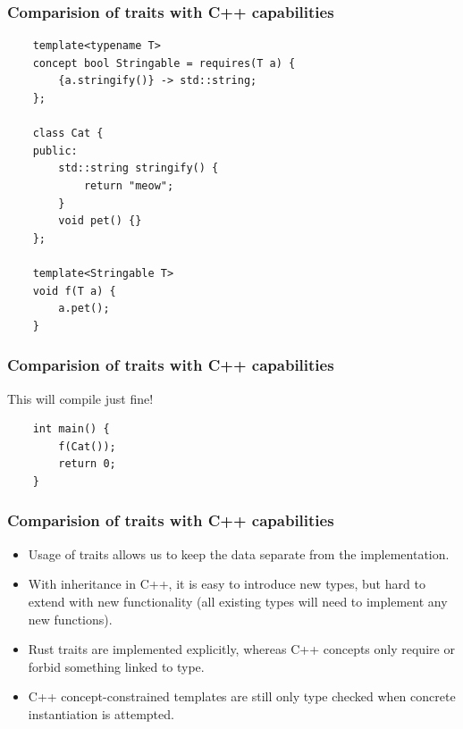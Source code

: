 \documentclass[aspectratio=1610,t]{beamer}
\begin{document}

\begin{frame}[fragile]
\frametitle{Comparision of traits with C++ capabilities}
\begin{verbatim}
    template<typename T>
    concept bool Stringable = requires(T a) {
        {a.stringify()} -> std::string;
    };

    class Cat {
    public:
        std::string stringify() {
            return "meow";
        }
        void pet() {}
    };

    template<Stringable T>
    void f(T a) {
        a.pet();
    }
\end{verbatim}
\end{frame}


\begin{frame}[fragile]
\frametitle{Comparision of traits with C++ capabilities}
This will compile just fine!

\begin{verbatim}
    int main() {
        f(Cat());
        return 0;
    }
\end{verbatim}
\end{frame}


\begin{frame}[fragile]
\frametitle{Comparision of traits with C++ capabilities}
\begin{itemize}
    \item<1-> Usage of traits allows us to keep the data separate from the implementation.
    \item<1-> With inheritance in C++, it is easy to introduce new types, but hard to extend with new functionality (all existing types will need to implement any new functions).
    \item<1-> Rust traits are implemented explicitly, whereas C++ concepts only require or forbid something linked to type.
    \item<1-> C++ concept-constrained templates are still only type checked when concrete instantiation is attempted.
\end{itemize}
\end{frame}

\end{document}
